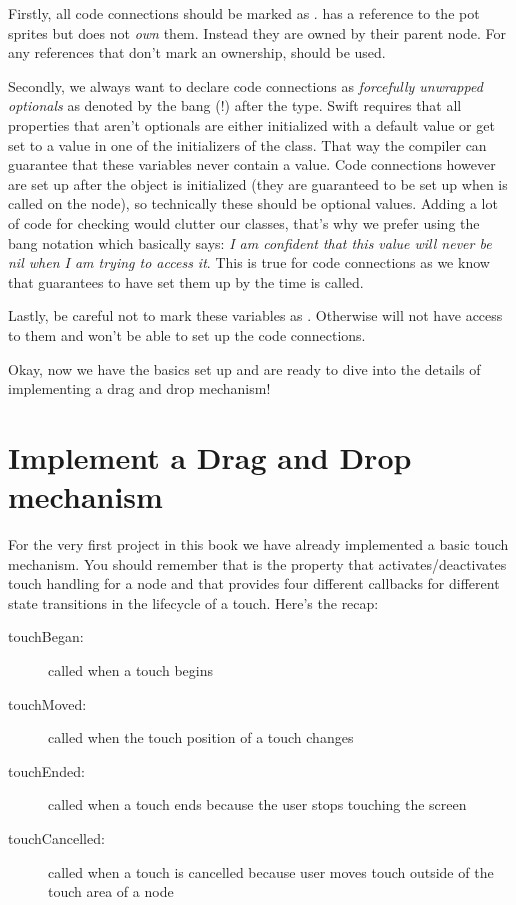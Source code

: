 Firstly, all code connections should be marked as .
 has a reference to the pot sprites but does not
\textit{own} them. Instead they are owned by their parent node. For any
references that don't mark an ownership,  should be used. 

Secondly, we always want to declare code connections as \textit{forcefully
unwrapped optionals} as denoted by the bang (!) after the type. Swift
requires that all properties that aren't optionals are either
initialized with a default value or get set to a value in one of the
initializers of the class. That way the compiler can guarantee that these
variables never contain a  value. Code connections however are
set up after the object is initialized (they are guaranteed to be set up
when  is called on the node), so technically these
should be optional values. Adding a lot of code for  checking
would clutter our classes, that's why we prefer using the bang notation which
basically says: \textit{I am confident that this value will never be nil when I
am trying to access it}. This is true for code connections as we know that
\cocos{} guarantees to have set them up by the time 
is called.

Lastly, be careful not to mark these variables as .
Otherwise \cocos{} will not have access to them and won't be able to set up the
code connections.

Okay, now we have the basics set up and are ready to dive into the details of
implementing a drag and drop mechanism!

\section{Implement a Drag and Drop mechanism}
For the very first project in this book we have already implemented a basic
touch mechanism. You should remember that  is
the property that activates/deactivates touch handling for a node and that
\cocos{} provides four different callbacks for different state transitions in
the lifecycle of a touch. Here's the recap:

\begin{description}
\item[touchBegan:] called when a touch begins
\item[touchMoved:] called when the touch position of a touch changes
\item[touchEnded:] called when a touch ends because the user stops touching the
screen
\item[touchCancelled:] called when a touch is cancelled because user moves touch
outside of the touch area of a node
\end{description}


